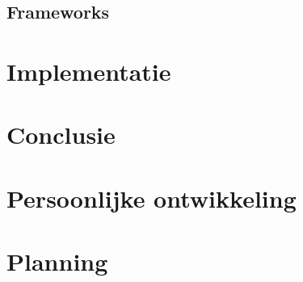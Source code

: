 \documentclass[a4paper,11pt,oneside]{report}
\begin{document}
\section{Frameworks}

\chapter{Implementatie}











\chapter{Conclusie}




\appendix
\chapter{Persoonlijke ontwikkeling}
\lipsum[1]

\chapter{Planning}
  \label{chap:planning}


\newpage

\printglossary


\renewcommand{\bibname}{Bronvermeldingen}



\nocite{*}

\end{document}
